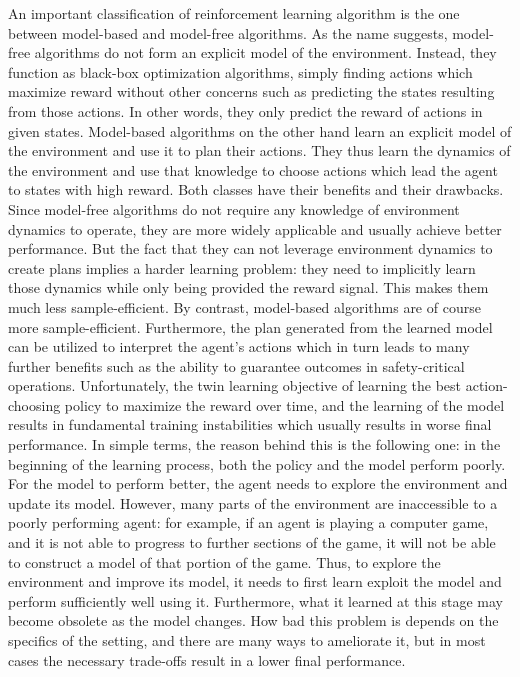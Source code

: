 An important classification of reinforcement learning algorithm is the one between
model-based and model-free algorithms.
As the name suggests, model-free algorithms do not form an explicit model of the environment.
Instead, they function as black-box optimization algorithms, simply finding actions which maximize
reward without other concerns such as predicting the states resulting from those actions.
In other words, they only predict the reward of actions in given states.
Model-based algorithms on the other hand learn an explicit model of the environment
and use it to plan their actions.
They thus learn the dynamics of the environment and use that knowledge to choose actions
which lead the agent to states with high reward.
Both classes have their benefits and their drawbacks.
Since model-free algorithms do not require any knowledge of environment dynamics
to operate, they are more widely applicable and usually achieve better performance.
But the fact that they can not leverage environment dynamics to create plans implies
a harder learning problem: they need to implicitly learn those dynamics
while only being provided the reward signal. 
This makes them much less sample-efficient.
By contrast, model-based algorithms are of course more sample-efficient.
Furthermore, the plan generated from the learned model can be utilized to interpret the
agent's actions which in turn leads to many further benefits such as
the ability to guarantee outcomes in safety-critical operations.
Unfortunately, the twin learning objective of learning the best action-choosing policy 
to maximize the reward over time, and the learning of the model results
in fundamental training instabilities which usually results in worse final performance.
In simple terms, the reason behind this is the following one:
in the beginning of the learning process, both the policy and the model perform poorly.
For the model to perform better, the agent needs to explore the environment and
update its model.
However, many parts of the environment are inaccessible to a poorly performing agent:
for example, if an agent is playing a computer game, and it is not able to progress to further
sections of the game, it will not be able to construct a model of that portion of the game.
Thus, to explore the environment and improve its model, it needs to first learn exploit 
the model and perform sufficiently well using it.
Furthermore, what it learned at this stage may become obsolete as the model changes.
How bad this problem is depends on the specifics of the setting,
and there are many ways to ameliorate it,
but in most cases the necessary trade-offs result in a lower final performance.

